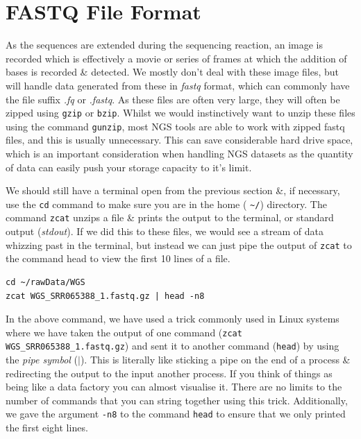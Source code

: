\section{FASTQ File Format}
\begin{note}
As the sequences are extended during the sequencing reaction, an image is recorded which is effectively a movie or series of frames at which the addition of bases is recorded \& detected.
We mostly don't deal with these image files, but will handle data generated from these in \textit{fastq} format, which can commonly have the file suffix \textit{.fq} or \textit{.fastq}.
As these files are often very large, they will often be zipped using \texttt{gzip} or \texttt{bzip}.
Whilst we would instinctively want to unzip these files using the command \texttt{gunzip}, most NGS tools are able to work with zipped fastq files, and this is usually unnecessary.
This can save considerable hard drive space, which is an important consideration when handling NGS datasets as the quantity of data can easily push your storage capacity to it's limit. \\
\end{note}

\begin{steps}
We should still have a terminal open from the previous section \&, if necessary, use the \texttt{cd} command to make sure you are in the home ( \texttt{\~{}/}) directory.
The command \texttt{zcat} unzips a file \& prints the output to the terminal, or standard output (\textit{stdout}).
If we did this to these files, we would see a stream of data whizzing past in the terminal, but instead we can just pipe the output of \texttt{zcat} to the command head to view the first 10 lines of a file. \\
\begin{lstlisting}
cd ~/rawData/WGS
zcat WGS_SRR065388_1.fastq.gz | head -n8
\end{lstlisting}
\end{steps}

\begin{information}
In the above command, we have used a trick commonly used in Linux systems where we have taken the output of one command (\texttt{zcat WGS_SRR065388_1.fastq.gz}) and sent it to another command (\texttt{head}) by using the \textit{pipe symbol} ($\mid$).
This is literally like sticking a pipe on the end of a process \& redirecting the output to the input another process.
If you think of things as being like a data factory you can almost visualise it.
There are no limits to the number of commands that you can string together using this trick.
Additionally, we gave the argument \texttt{-n8} to the command \texttt{head} to ensure that we only printed the first eight lines.\\
\end{information}

